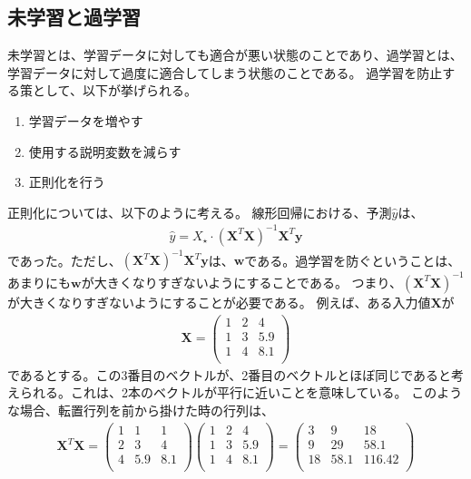 \documentclass{ltjsarticle}
\begin{document}
\subsection{未学習と過学習}
未学習とは、学習データに対しても適合が悪い状態のことであり、過学習とは、学習データに対して過度に適合してしまう状態のことである。
過学習を防止する策として、以下が挙げられる。
\begin{enumerate}
  \item 学習データを増やす
  \item 使用する説明変数を減らす
  \item 正則化を行う
\end{enumerate}
正則化については、以下のように考える。
線形回帰における、予測$\hat{y}$は、
\begin{align}
  \hat{y} = X_{\star} \cdot (\boldsymbol{X}^T\boldsymbol{X})^{-1}\boldsymbol{X}^T\boldsymbol{y}
\end{align}
であった。ただし、$(\boldsymbol{X}^T\boldsymbol{X})^{-1}\boldsymbol{X}^T\boldsymbol{y}$は、$\boldsymbol{w}$である。過学習を防ぐということは、あまりにも$\boldsymbol{w}$が大きくなりすぎないようにすることである。
つまり、$(\boldsymbol{X}^T\boldsymbol{X})^{-1}$が大きくなりすぎないようにすることが必要である。
例えば、ある入力値$\boldsymbol{X}$が
\begin{align}
 \boldsymbol{X} = 
  \begin{pmatrix}
    1 & 2 & 4 \\
    1 & 3 & 5.9\\
    1 & 4 & 8.1\\
  \end{pmatrix}
\end{align}
であるとする。この3番目のベクトルが、2番目のベクトルとほぼ同じであると考えられる。これは、2本のベクトルが平行に近いことを意味している。
このような場合、転置行列を前から掛けた時の行列は、
\begin{align}
  \boldsymbol{X}^T\boldsymbol{X} = 
  \begin{pmatrix}
    1 & 1 & 1\\
    2 & 3 & 4\\
    4 & 5.9 & 8.1\\
  \end{pmatrix}
  \begin{pmatrix}
    1 & 2 & 4 \\
    1 & 3 & 5.9\\
    1 & 4 & 8.1\\
  \end{pmatrix}
  =
  \begin{pmatrix}
    3 & 9 & 18\\
    9 & 29 & 58.1\\
    18 & 58.1 & 116.42\\ 
  \end{pmatrix}
\end{align}
\end{document}
